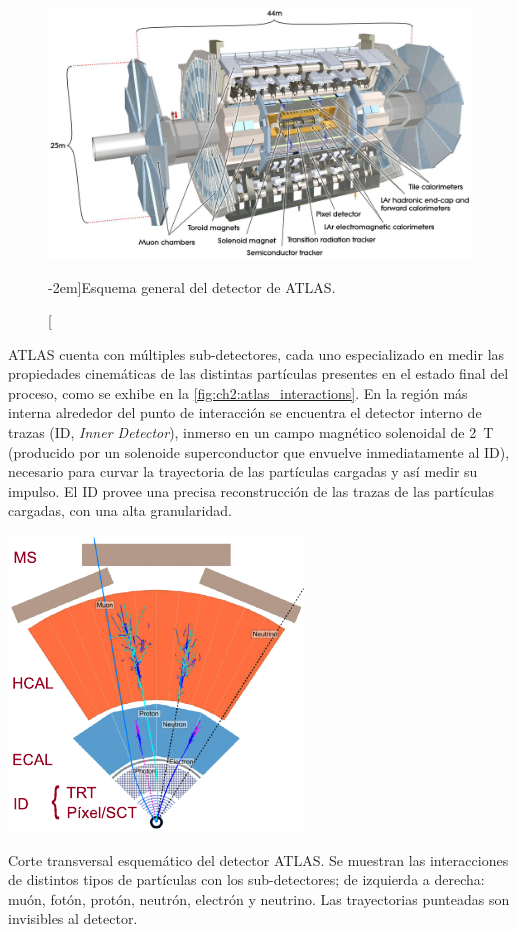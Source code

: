 \begin{figure}[t]
    \centering
    \includegraphics[width=0.99\linewidth]{Assets/Images/ATLAS_schematic.jpg}
    \caption[][-2em]{Esquema general del detector de ATLAS.}
    \label{fig:ch2:atlas_schematic}
\end{figure}

ATLAS cuenta con múltiples sub-detectores, cada uno especializado en medir las propiedades cinemáticas de las distintas partículas presentes en el estado final del proceso, como se exhibe en la \cref{fig:ch2:atlas_interactions}. En la región más interna alrededor del punto de interacción se encuentra el detector interno de trazas (ID, \textit{Inner Detector}), inmerso en un campo magnético solenoidal de \SI{2}{\tesla} (producido por un solenoide superconductor que envuelve inmediatamente al ID), necesario para curvar la trayectoria de las partículas cargadas y así medir su impulso. El ID provee una precisa reconstrucción de las trazas de las partículas cargadas, con una alta granularidad.

\begin{marginfigure}[-70pt]
    \centering
    \includegraphics[width=0.99\marginparwidth]{Assets/Images/ATLAS_interactions.pdf}
    \caption{Corte transversal esquemático del detector ATLAS. Se muestran las interacciones de distintos tipos de partículas con los sub-detectores; de izquierda a derecha: muón, fotón, protón, neutrón, electrón y neutrino. Las trayectorias punteadas son invisibles al detector.}
    \label{fig:ch2:atlas_interactions}
\end{marginfigure}

